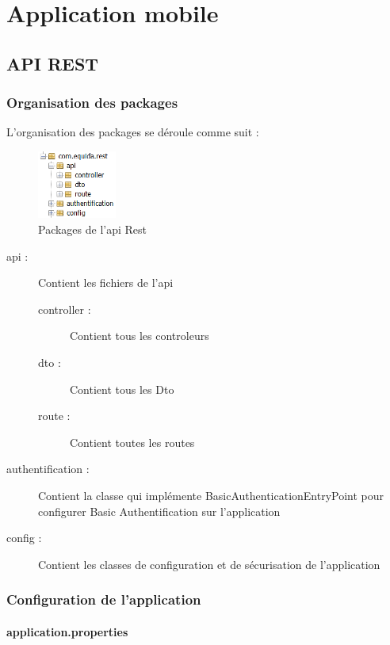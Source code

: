 \chapter{Application mobile}
\label{chapter:app_mobile}
	\section{API REST}

		\subsection{Organisation des packages}

			L'organisation des packages se déroule comme suit :

			\begin{figure}[H]
				\centering\includegraphics[width=0.23\textwidth, keepaspectratio]{res/package.png}
				\caption{Packages de l'api Rest}
			\end{figure}

			\begin{description}
				\item[api :]{Contient les fichiers de l'api}
				\begin{description}
					\item[controller :]{Contient tous les controleurs}
					\item[dto :]{Contient tous les Dto}
					\item[route :]{Contient toutes les routes}
				\end{description}
				\item[authentification :]{Contient la classe qui implémente BasicAuthenticationEntryPoint pour configurer Basic Authentification sur l'application}
				\item[config :]{Contient les classes de configuration et de sécurisation de l'application}
			\end{description}

		\subsection{Configuration de l'application}

			\subsubsection{application.properties}

